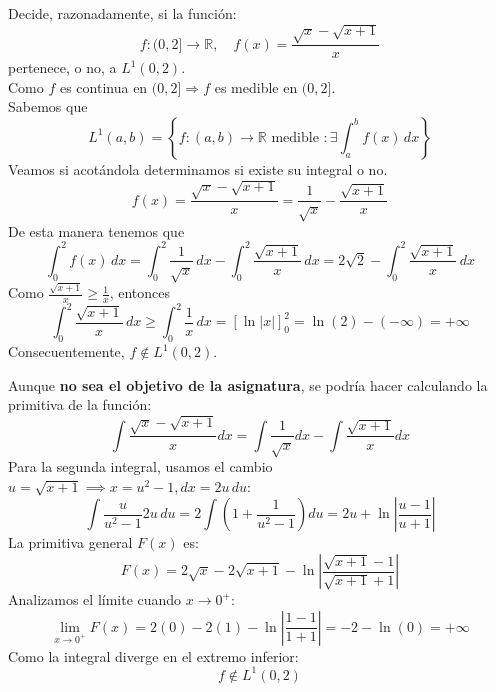 \documentclass[12pt]{article}
\begin{document}
    \begin{ejercicio}[3 puntos]
        Decide, razonadamente, si la función:
        $$ f: (0, 2] \rightarrow \mathbb{R}, \quad f(x) = \frac{\sqrt{x} - \sqrt{x+1}}{x} $$
        pertenece, o no, a $L^1(0, 2)$. \\
        
        Como $f$ es continua en $(0,2] \Rightarrow f$ es medible en $(0,2]$.\\
        
        Sabemos que $$L^1(a,b) = \left\{ f:(a, b) \rightarrow \mathbb{R} \text{ medible }: \exists \int^b_a f(x) \, dx\right\}$$ 
        Veamos si acotándola determinamos si existe su integral o no.
        $$ f(x) = \frac{\sqrt{x} - \sqrt{x+1}}{x} = \frac{1}{\sqrt{x}} -\frac{\sqrt{x+1}}{x}$$ 
        De esta manera tenemos que $$\int^2_0 f(x) \, dx = \int^2_0 \frac{1}{\sqrt{x}} \, dx - \int^2_0 \frac{\sqrt{x+1}}{x} \, dx = 2\sqrt{2}-\int^2_0 \frac{\sqrt{x+1}}{x} \, dx$$ 
        Como $\displaystyle \frac{\sqrt{x+1}}{x} \geq \frac{1}{x}$, entonces $$\int^2_0\frac{\sqrt{x+1}}{x} \, dx \geq \int^2_0\frac{1}{x} \, dx = \left[ \ln{|x|}\right]^2_0 = \ln(2) - (-\infty) = +\infty$$
        Consecuentemente, $f \notin L^1(0, 2)$.

        \vspace{1cm}
        
        Aunque \textbf{no sea el objetivo de la asignatura}, se podría hacer calculando la primitiva de la función:
        $$ \int \frac{\sqrt{x} - \sqrt{x+1}}{x} dx = \int \frac{1}{\sqrt{x}} dx - \int \frac{\sqrt{x+1}}{x} dx $$
        Para la segunda integral, usamos el cambio $u = \sqrt{x+1} \implies x = u^2 - 1, dx = 2u \, du$:
        $$ \int \frac{u}{u^2-1} 2u \, du = 2 \int \left( 1 + \frac{1}{u^2-1} \right) du = 2u + \ln\left| \frac{u-1}{u+1} \right| $$
        La primitiva general $F(x)$ es:
        $$ F(x) = 2\sqrt{x} - 2\sqrt{x+1} - \ln\left| \frac{\sqrt{x+1}-1}{\sqrt{x+1}+1} \right| $$
        Analizamos el límite cuando $x \to 0^+$:
        $$ \lim_{x \to 0^+} F(x) = 2(0) - 2(1) - \ln\left| \frac{1-1}{1+1} \right| = -2 - \ln(0) = +\infty $$
        Como la integral diverge en el extremo inferior:
        $$ f \notin L^1(0, 2) $$
    \end{ejercicio}
\end{document}
